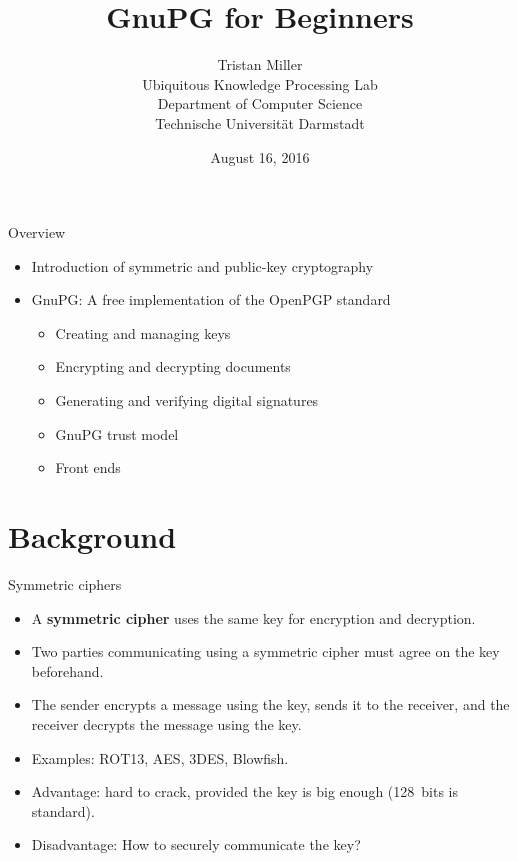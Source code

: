 \documentclass[
mode=present,
paper=smartboard,
size=20pt,
]{powerdot}
\title{GnuPG for Beginners}
\author{%
  Tristan Miller\\
  Ubiquitous Knowledge Processing Lab\\
  Department of Computer Science\\
  Technische Universit\"at Darmstadt
}
\date{August 16, 2016}
\begin{document}
\maketitle

\begin{slide}[toc=]{Overview}
  \begin{itemize}
  \item Introduction of symmetric and public-key cryptography
  \item GnuPG: A free implementation of the OpenPGP standard
    \begin{itemize}
    \item Creating and managing keys
    \item Encrypting and decrypting documents
    \item Generating and verifying digital signatures
    \item GnuPG trust model
    \item Front ends
    \end{itemize}
  \end{itemize}
\end{slide}

\section{Background}
\begin{slide}{Symmetric ciphers}
  \begin{itemize}
  \item A \textbf{symmetric cipher} uses the same key for encryption
    and decryption.
  \item Two parties communicating using a symmetric cipher must agree
    on the key beforehand.
  \item The sender encrypts a message using the key,
    sends it to the receiver, and the receiver decrypts the message
    using the key.
  \item Examples: ROT13, AES, 3DES, Blowfish.
  \item Advantage: hard to crack, provided the key is big enough
    (128~bits is standard).
  \item Disadvantage: How to securely communicate the key?
  \end{itemize}
\end{slide}
\end{document}
